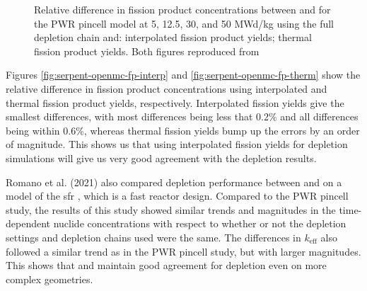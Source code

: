 \begin{figure}[htpb]
{    \label{fig:serpent-openmc-fp-therm}}
    \caption[Relative difference in fission product concentrations between
    OpenMC and Serpent for the PWR pincell model]{Relative difference in fission
    product concentrations between \OpenMC and \SerpentTWO for the PWR pincell model
    at 5, 12.5, 30, and 50 MWd/kg using the full depletion chain and:
     interpolated fission product yields;
     thermal fission product yields.
    Both figures reproduced from \cite{romano_depletion_2021}}
    \label{fig:pwr-serpent-openmc-fp}
\end{figure}

Figures \ref{fig:serpent-openmc-fp-interp} and
\ref{fig:serpent-openmc-fp-therm} show the relative difference in fission
product concentrations using interpolated and thermal fission product yields,
respectively. Interpolated fission yields give the smallest differences, with
most differences being less that 0.2\% and all differences being within 0.6\%,
whereas thermal fission yields bump up the errors by an order of magnitude. This
shows us that using interpolated fission yields for \OpenMC depletion
simulations will give us very good agreement with the \SerpentTWO depletion
results.

Romano et al. (2021) also compared depletion performance between \OpenMC and
\SerpentTWO on a model of the \Gls{sfr} \cite{oecd_benchmark_2016}, which is a
fast reactor design. Compared to the PWR pincell study, the results of this
study showed similar trends and magnitudes in the time-dependent nuclide
concentrations with respect to whether or not the depletion settings and
depletion chains used were the same. The differences in $k_\text{eff}$ also
followed a similar trend as in the PWR pincell study, but with larger
magnitudes. This shows that \OpenMC and \SerpentTWO maintain good agreement for
depletion even on more complex geometries.

